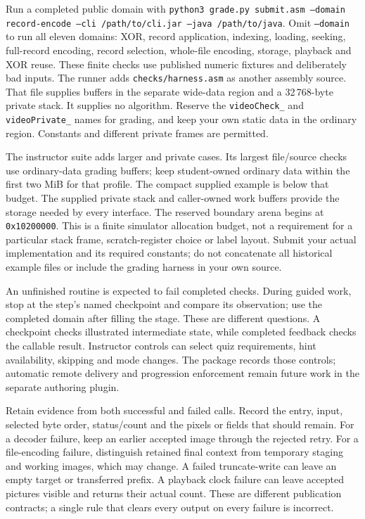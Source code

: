 Run a completed public domain with \texttt{python3 grade.py submit.asm --domain
record-encode --cli /path/to/cli.jar --java /path/to/java}. Omit \texttt{--domain}
to run all eleven domains: XOR, record application, indexing, loading, seeking,
full-record encoding, record selection, whole-file encoding, storage, playback and
XOR reuse. These finite checks use published numeric fixtures and deliberately bad
inputs. The runner adds \texttt{checks/harness.asm} as another assembly source.
That file supplies buffers in the separate wide-data region and a 32\,768-byte
private stack. It supplies no algorithm. Reserve the \texttt{videoCheck\_} and
\texttt{videoPrivate\_} names for grading, and keep your own static data in the
ordinary region. Constants and different private frames are permitted.

The instructor suite adds larger and private cases. Its largest file/source checks
use ordinary-data grading buffers; keep student-owned ordinary data within the first two MiB for
that profile. The compact supplied example is below that budget. The supplied
private stack and caller-owned work buffers provide the storage needed by every
interface. The reserved boundary arena begins at \texttt{0x10200000}. This is a finite simulator allocation budget, not a requirement for a
particular stack frame, scratch-register choice or label layout. Submit your actual
implementation and its required constants; do not concatenate all historical
example files or include the grading harness in your own source.

An unfinished routine is expected to fail completed checks. During guided work,
stop at the step's named checkpoint and compare its observation; use the completed
domain after filling the stage. These are different questions. A checkpoint checks
illustrated intermediate state, while completed feedback checks the callable result.
Instructor controls can select quiz requirements, hint availability, skipping and
mode changes. The package records those controls; automatic remote delivery and
progression enforcement remain future work in the separate authoring plugin.

Retain evidence from both successful and failed calls. Record the entry, input,
selected byte order, status/count and the pixels or fields that should remain.
For a decoder failure, keep an earlier accepted image through the rejected retry.
For a file-encoding failure, distinguish retained final context from temporary
staging and working images, which may change. A failed truncate-write can leave an
empty target or transferred prefix. A playback clock failure can leave accepted
pictures visible and returns their actual count. These are different publication
contracts; a single rule that clears every output on every failure is incorrect.

